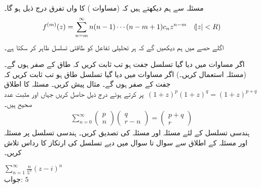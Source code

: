 مسئلہ   سے ہم دیکھتے ہیں کہ  (مساوات ) کا  واں تفرق  درج ذیل ہو گا۔
\begin{align}
f^{(m)}(z)=\sum\limits_{n=m}^{\infty} n(n-1)\cdots(n-m+1)c_nz^{n-m}\quad (\abs{z}<R)
\end{align}
اگلے حصے میں ہم دیکھیں گے کہ ہر تحلیلی تفاعل کو طاقتی تسلسل ظاہر کر سکتا ہے۔

\quad
اگر مساوات  میں دیا گیا تسلسل جفت ہو تب ثابت کریں کہ طاق  کے   صفر ہوں گے۔ (مسئلہ  استعمال کریں۔)
\quad
اگر مساوات  میں دیا گیا تسلسل طاق ہو تب ثابت کریں کہ جفت  کے   صفر ہوں گے۔ مثال پیش کریں۔
\quad
مسئلہ  کا اطلاق 
$\,(1+z)^p(1+z)^q=(1+z)^{p+q}\,$
پر کرتے ہوئے درج ذیل حاصل کریں جہاں  اور  مثبت عدد صحیح ہیں۔
\begin{align*}
\sum\limits_{n=0}^{\infty}
\begin{pmatrix}
p\\
n
\end{pmatrix}
\begin{pmatrix}
q\\
r-n
\end{pmatrix}=
\begin{pmatrix}
p+q\\
r
\end{pmatrix}
\end{align*}
\quad 
ہندسی تسلسل کے لئے مسئلہ  اور مسئلہ  کی تصدیق کریں۔
ہندسی تسلسل پر مسئلہ  اور مسئلہ  کے اطلاق سے سوال  تا سوال  میں دیے تسلسل کی ارتکاز کا رداس تلاش کریں۔ 

\quad
$\sum\limits_{n=1}^{\infty}\tfrac{n}{5^n}(z-i)^n$\\
جواب:\quad
$5$

